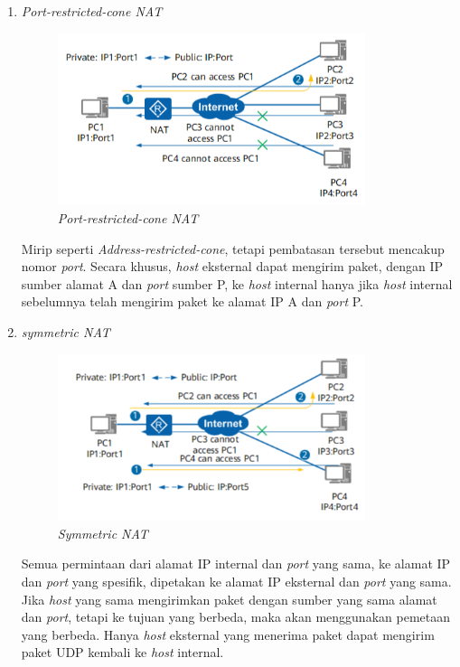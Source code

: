 \begin{enumerate}
  \item{\emph{Port-restricted-cone NAT}}
  \begin{figure}[H]
    \centering{}
    \includegraphics[width=0.85\textwidth]{gambar/port_restricted_cone_nat}
    \caption{\emph{Port-restricted-cone NAT}}
  \end{figure}

  Mirip seperti \emph{Address-restricted-cone}, tetapi pembatasan tersebut mencakup nomor \emph{port}. Secara khusus, \emph{host} eksternal dapat mengirim paket, dengan IP sumber alamat A dan \emph{port} sumber P, ke \emph{host} internal hanya jika \emph{host} internal sebelumnya telah mengirim paket ke alamat IP A dan \emph{port} P.

  \item{\emph{symmetric NAT}}
  \begin{figure}[H]
    \centering{}
    \includegraphics[width=0.85\textwidth]{gambar/symmetric_nat}
    \caption{\emph{Symmetric NAT}}
  \end{figure}

  Semua permintaan dari alamat IP internal dan \emph{port} yang sama, ke alamat IP dan \emph{port} yang spesifik, dipetakan ke alamat IP eksternal dan \emph{port} yang sama. Jika \emph{host} yang sama mengirimkan paket dengan sumber yang sama alamat dan \emph{port}, tetapi ke tujuan yang berbeda, maka akan menggunakan pemetaan yang berbeda. Hanya \emph{host} eksternal yang menerima paket dapat mengirim paket UDP kembali ke \emph{host} internal.
\end{enumerate}

